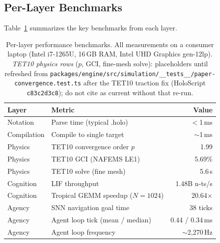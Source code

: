 \documentclass[sigchi-a]{acmart}
\providecommand{\measuredFrom}[1]{}
\begin{document}
\subsection{Per-Layer Benchmarks}

Table~\ref{tab:benchmarks} summarizes the key benchmarks from each layer.

\begin{table}[t]
  \caption{Per-layer performance benchmarks. All measurements on a consumer
  laptop (Intel i7-1265U, 16\,GB RAM, Intel UHD Graphics gen-12lp).
  \emph{TET10 physics rows} ($p$, GCI, fine-mesh solve): placeholders until refreshed from
  \texttt{packages/engine/\allowbreak src/simulation/\allowbreak \_\_tests\_\_/\allowbreak paper-convergence.test.ts}
  after the TET10 traction fix (HoloScript \texttt{c83c2d3c8}); do not cite as current without that re-run.}
  \label{tab:benchmarks}
  \small
  \measuredFrom{HoloScript/packages/engine/src/simulation/__tests__/paper-benchmarks.test.ts}%
  \measuredFrom{HoloScript/packages/engine/src/simulation/__tests__/paper-cael-replay-benchmark.test.ts}%
  \measuredFrom{HoloScript/packages/snn-webgpu/src/__tests__/lif-simulator.test.ts}%
  \measuredFrom{HoloScript/packages/snn-webgpu/src/__tests__/tropical-shortest-paths.benchmark.test.ts}%
  \measuredFrom{HoloScript/packages/security-sandbox/src/__tests__/adversarial-holo.test.ts}%
  \begin{tabular}{llr}
    \toprule
    \textbf{Layer} & \textbf{Metric} & \textbf{Value} \\
    \midrule
    Notation    & Parse time (typical .holo)       & $<$1\,ms \\
    Compilation & Compile to single target          & $\sim$1\,ms \\
    Physics     & TET10 convergence order $p$       & 1.99 \\
    Physics     & TET10 GCI (NAFEMS LE1)            & 5.69\% \\
    Physics     & TET10 solve (fine mesh)            & 5.6\,s \\
    Cognition   & LIF throughput                    & 1.48B n-ts/s \\
    Cognition   & Tropical GEMM speedup ($N{=}1024$) & 20.64$\times$ \\
    Agency      & SNN navigation goal time          & 38 ticks \\
    Agency      & Agent loop tick (mean / median)    & 0.44 / 0.34\,ms \\
    Agency      & Agent loop frequency              & $\sim$2{,}270\,Hz \\

\end{tabular}
\end{table}
\end{document}
